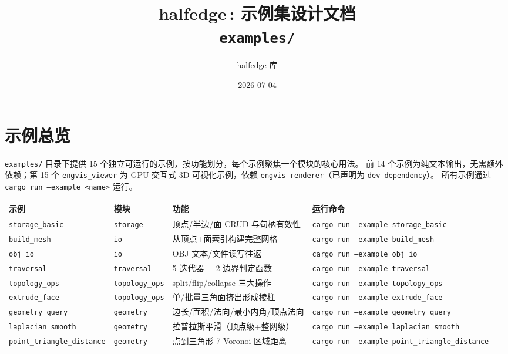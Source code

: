 \documentclass[11pt,a4paper]{article}
\title{\textbf{halfedge\,: 示例集设计文档} \\ \large \texttt{examples/}}
\author{halfedge 库}
\date{2026-07-04}
\begin{document}
\maketitle
\tableofcontents

\section{示例总览}

\texttt{examples/} 目录下提供 15 个独立可运行的示例，按功能划分，每个示例聚焦一个模块的核心用法。
前 14 个示例为纯文本输出，无需额外依赖；第 15 个 \texttt{engvis\_viewer} 为 GPU 交互式 3D 可视化示例，依赖 \texttt{engvis-renderer}（已声明为 \texttt{dev-dependency}）。
所有示例通过 \texttt{cargo run --example <name>} 运行。

\begin{center}
\renewcommand{\arraystretch}{1.18}
\begin{tabular}{@{}p{3.4cm}p{2.0cm}p{5.2cm}p{5.4cm}@{}}
  \toprule
  \textbf{示例} & \textbf{模块} & \textbf{功能} & \textbf{运行命令} \\
  \midrule
  \texttt{storage\_basic}            & \texttt{storage}    & 顶点/半边/面 CRUD 与句柄有效性 & \texttt{cargo run --example storage\_basic} \\
  \texttt{build\_mesh}               & \texttt{io}         & 从顶点+面索引构建完整网格     & \texttt{cargo run --example build\_mesh} \\
  \texttt{obj\_io}                   & \texttt{io}         & OBJ 文本/文件读写往返         & \texttt{cargo run --example obj\_io} \\
  \texttt{traversal}                 & \texttt{traversal}  & 5 迭代器 + 2 边界判定函数     & \texttt{cargo run --example traversal} \\
  \texttt{topology\_ops}             & \texttt{topology\_ops} & split/flip/collapse 三大操作 & \texttt{cargo run --example topology\_ops} \\
  \texttt{extrude\_face}             & \texttt{topology\_ops} & 单/批量三角面挤出形成棱柱    & \texttt{cargo run --example extrude\_face} \\
  \texttt{geometry\_query}           & \texttt{geometry}   & 边长/面积/法向/最小内角/顶点法向 & \texttt{cargo run --example geometry\_query} \\
  \texttt{laplacian\_smooth}         & \texttt{geometry}   & 拉普拉斯平滑（顶点级+整网级） & \texttt{cargo run --example laplacian\_smooth} \\
  \texttt{point\_triangle\_distance} & \texttt{geometry}   & 点到三角形 7-Voronoi 区域距离 & \texttt{cargo run --example point\_triangle\_distance} \\

\end{tabular}
\end{center}
\end{document}
